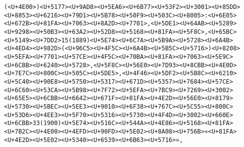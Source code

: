\documentclass[
]{article}
\begin{document}
\begin{verbatim}
(<U+4E00>)<U+5177><U+9AD8><U+5EA6><U+6B77><U+53F2><U+3001><U+85DD><U+8853><U+6216><U+79D1><U+5B78><U+50F9><U+503C><U+8005>:<U+6E05><U+672B><U+81FA><U+7063><U+8A2D><U+7701>,<U+5DE1><U+64AB><U+5289><U+9298><U+50B3><U+63A2><U+52D8><U+5168><U+81FA><U+5F8C>,<U+65BC><U+5149><U+7DD2>15(1889)<U+5E74><U+6C7A><U+5B9A><U+5728><U+6A4B><U+4ED4><U+982D>(<U+96C5><U+4F5C><U+6A4B><U+5B5C><U+5716>)<U+8208><U+5EFA><U+7701><U+57CE><U+4F5C><U+70BA><U+81FA><U+7063><U+5E9C><U+6CBB><U+6240><U+5728>,<U+5F8C><U+56E0><U+7D93><U+8CBB><U+4E0D><U+7E7C><U+800C><U+505C><U+5DE5>,<U+4F46><U+5DF2><U+5B8C><U+6210><U+5C40><U+90E8><U+5750><U+5317><U+671D><U+5357><U+7684><U+57CE><U+6C60><U+53CA><U+5B98><U+7F72><U+5EFA><U+7BC9><U+7269><U+3002><U+65E5><U+6CBB><U+6642><U+671F><U+81FA><U+4E2D><U+56E0><U+8179><U+5730><U+5BEC><U+5EE3><U+9010><U+6F38><U+767C><U+5C55><U+800C><U+53D6><U+4EE3><U+5F70><U+5316><U+5730><U+4F4D><U+3002><U+660E><U+6CBB>33(1900)<U+5E74><U+516C><U+544A><U+4E86><U+5168><U+81FA><U+7B2C><U+4E00><U+4EFD><U+90FD><U+5E02><U+8A08><U+756B>«<U+81FA><U+4E2D><U+5E02><U+5340><U+6539><U+6B63><U+5716>», 
\end{verbatim}
\end{document}

